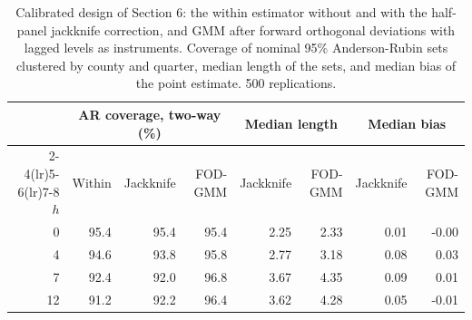 \begin{table}[ht]\centering\footnotesize
\begin{tabular}{r rrr rr rr}\toprule
 & \multicolumn{3}{c}{AR coverage, two-way (\%)} & \multicolumn{2}{c}{Median length} & \multicolumn{2}{c}{Median bias}\\
\cmidrule(lr){2-4}\cmidrule(lr){5-6}\cmidrule(lr){7-8}
$h$ & Within & Jackknife & FOD-GMM & Jackknife & FOD-GMM & Jackknife & FOD-GMM\\\midrule
0 & 95.4 & 95.4 & 95.4 & 2.25 & 2.33 & 0.01 & -0.00\\
4 & 94.6 & 93.8 & 95.8 & 2.77 & 3.18 & 0.08 & 0.03\\
7 & 92.4 & 92.0 & 96.8 & 3.67 & 4.35 & 0.09 & 0.01\\
12 & 91.2 & 92.2 & 96.4 & 3.62 & 4.28 & 0.05 & -0.01\\
\bottomrule\end{tabular}
\caption{Calibrated design of Section 6: the within estimator without and with the half-panel jackknife correction, and GMM after forward orthogonal deviations with lagged levels as instruments. Coverage of nominal 95\% Anderson-Rubin sets clustered by county and quarter, median length of the sets, and median bias of the point estimate. 500 replications.\label{tab:mc_gmm}}
\end{table}